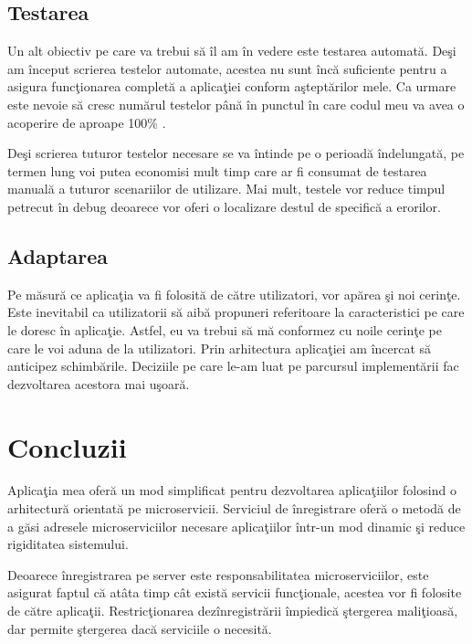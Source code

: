 \documentclass[a4paper,12pt]{report}
\begin{document}
\section{Testarea }

Un alt obiectiv pe care va trebui s\u a \^il am \^in vedere este testarea automat\u a.
De\c si am \^inceput scrierea testelor automate, acestea nu sunt \^inc\u a suficiente pentru 
a asigura func\c tionarea complet\u a a aplica\c tiei conform a\c stept\u arilor mele.
Ca urmare este nevoie s\u a cresc num\u arul testelor p\^an\u a \^in punctul \^in care 
codul meu va avea o acoperire de aproape 100\% .

De\c si scrierea tuturor testelor necesare 
se va \^intinde pe o perioad\u a \^indelungat\u a, pe termen lung voi putea economisi mult timp
care ar fi consumat de testarea manual\u a a tuturor scenariilor de utilizare. Mai mult,
testele vor reduce timpul petrecut \^in debug deoarece vor oferi o localizare destul de specific\u a
a erorilor. 

\section{Adaptarea}

Pe m\u asur\u a ce aplica\c tia va fi folosit\u a de c\u atre utilizatori, 
vor ap\u area \c si noi cerin\c te. Este inevitabil ca utilizatorii 
s\u a aib\u a propuneri referitoare la caracteristici pe care le doresc 
\^in aplica\c tie. Astfel, eu va trebui s\u a m\u a conformez cu noile 
cerin\c te pe care le voi aduna de la utilizatori. Prin arhitectura aplica\c tiei 
am \^incercat s\u a anticipez schimb\u arile. Deciziile pe care le-am luat pe parcursul 
implement\u arii  fac dezvoltarea acestora 
mai u\c soar\u a.

\chapter{Concluzii}

Aplica\c tia mea ofer\u a un mod simplificat pentru dezvoltarea aplica\c tiilor 
folosind o arhitectur\u a orientat\u a pe microservicii.
Serviciul de \^inregistrare ofer\u a o metod\u a de a g\u asi adresele microserviciilor necesare aplica\c tiilor 
\^intr-un mod dinamic \c si reduce rigiditatea sistemului.

Deoarece \^inregistrarea pe server este responsabilitatea microserviciilor, 
este asigurat faptul c\u a at\^ata timp c\^at exist\u a servicii func\c tionale,
acestea vor fi folosite de c\u atre aplica\c tii. Restric\c tionarea dez\^inregistr\u arii
\^impiedic\u a \c stergerea mali\c tioas\u a, dar permite \c stergerea dac\u a serviciile 
o necesit\u a.
\end{document}
